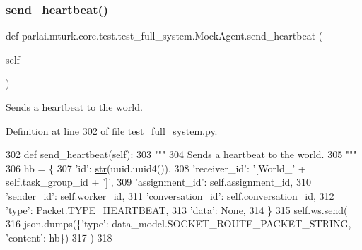 \subsubsection{\texorpdfstring{send\+\_\+heartbeat()}{send\_heartbeat()}}
{\footnotesize\ttfamily def parlai.\+mturk.\+core.\+test.\+test\+\_\+full\+\_\+system.\+Mock\+Agent.\+send\+\_\+heartbeat (\begin{DoxyParamCaption}\item[{}]{self }\end{DoxyParamCaption})}

\begin{DoxyVerb}Sends a heartbeat to the world.
\end{DoxyVerb}
 

Definition at line 302 of file test\+\_\+full\+\_\+system.\+py.


\begin{DoxyCode}
302     \textcolor{keyword}{def }send\_heartbeat(self):
303         \textcolor{stringliteral}{"""}
304 \textcolor{stringliteral}{        Sends a heartbeat to the world.}
305 \textcolor{stringliteral}{        """}
306         hb = \{
307             \textcolor{stringliteral}{'id'}: \hyperlink{namespacegenerate__task__READMEs_a5b88452ffb87b78c8c85ececebafc09f}{str}(uuid.uuid4()),
308             \textcolor{stringliteral}{'receiver\_id'}: \textcolor{stringliteral}{'[World\_'} + self.task\_group\_id + \textcolor{stringliteral}{']'},
309             \textcolor{stringliteral}{'assignment\_id'}: self.assignment\_id,
310             \textcolor{stringliteral}{'sender\_id'}: self.worker\_id,
311             \textcolor{stringliteral}{'conversation\_id'}: self.conversation\_id,
312             \textcolor{stringliteral}{'type'}: Packet.TYPE\_HEARTBEAT,
313             \textcolor{stringliteral}{'data'}: \textcolor{keywordtype}{None},
314         \}
315         self.ws.send(
316             json.dumps(\{\textcolor{stringliteral}{'type'}: data\_model.SOCKET\_ROUTE\_PACKET\_STRING, \textcolor{stringliteral}{'content'}: hb\})
317         )
318 
\end{DoxyCode}
\mbox{\label{classparlai_1_1mturk_1_1core_1_1test_1_1test__full__system_1_1MockAgent_a6eaaac34d4b7644c88bab53eeb12ebb1}} 
